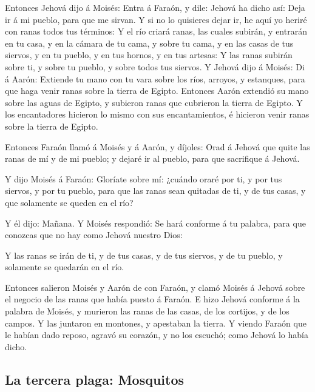  Entonces Jehová dijo á Moisés: Entra á Faraón, y dile:
Jehová ha dicho así: Deja ir á mi pueblo, para que me sirvan.
 Y si no lo quisieres dejar ir, he aquí yo heriré con ranas
todos tus términos:  Y el río criará ranas, las cuales
subirán, y entrarán en tu casa, y en la cámara de tu cama, y sobre tu
cama, y en las casas de tus siervos, y en tu pueblo, y en tus hornos, y
en tus artesas:  Y las ranas subirán sobre ti, y sobre tu
pueblo, y sobre todos tus siervos.  Y Jehová dijo á Moisés:
Di á Aarón: Extiende tu mano con tu vara sobre los ríos, arroyos, y
estanques, para que haga venir ranas sobre la tierra de Egipto.
 Entonces Aarón extendió su mano sobre las aguas de Egipto,
y subieron ranas que cubrieron la tierra de Egipto.  Y los
encantadores hicieron lo mismo con sus encantamientos, é hicieron venir
ranas sobre la tierra de Egipto.

 Entonces Faraón llamó á Moisés y á Aarón, y díjoles: Orad á
Jehová que quite las ranas de mí y de mi pueblo; y dejaré ir al pueblo,
para que sacrifique á Jehová.

 Y dijo Moisés á Faraón: Gloríate sobre mí: ¿cuándo oraré
por ti, y por tus siervos, y por tu pueblo, para que las ranas sean
quitadas de ti, y de tus casas, y que solamente se queden en el río?

 Y él dijo: Mañana. Y Moisés respondió: Se hará conforme á
tu palabra, para que conozcas que no hay como Jehová nuestro Dios:

 Y las ranas se irán de ti, y de tus casas, y de tus
siervos, y de tu pueblo, y solamente se quedarán en el río.

 Entonces salieron Moisés y Aarón de con Faraón, y clamó
Moisés á Jehová sobre el negocio de las ranas que había puesto á Faraón.
 E hizo Jehová conforme á la palabra de Moisés, y murieron
las ranas de las casas, de los cortijos, y de los campos. 
Y las juntaron en montones, y apestaban la tierra.  Y
viendo Faraón que le habían dado reposo, agravó su corazón, y no los
escuchó; como Jehová lo había dicho.

\hypertarget{la-tercera-plaga-mosquitos}{%
\subsection{La tercera plaga:
Mosquitos}\label{la-tercera-plaga-mosquitos}}

